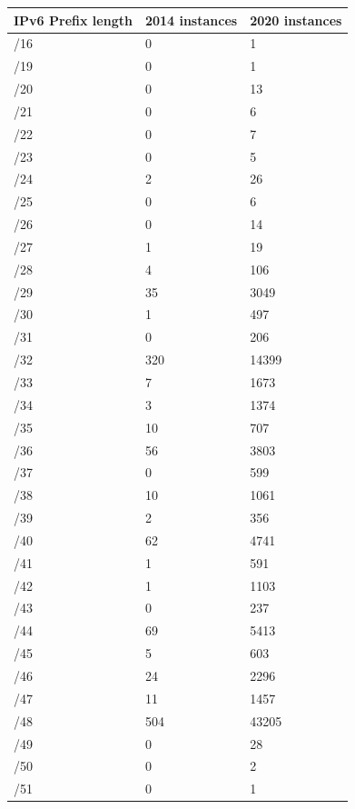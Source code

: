 \documentclass[10pt,sigconf]{acmart}
\begin{document}
\begin{table}[]
\centering
\label{ipv6-scanning}
\begin{center}
	\begin{tabular}{|l|l|l|}
		\hline
		IPv6 Prefix length & 2014 instances & 2020 instances   \\ \hline
		/16 & 0 & 1   \\ \hline
		/19 & 0 & 1   \\ \hline
		/20 & 0 & 13   \\ \hline
		/21 & 0 & 6  \\ \hline
		/22 & 0 & 7   \\ \hline
		/23 & 0 & 5   \\ \hline
		/24 & 2 & 26   \\ \hline
		/25 & 0 & 6   \\ \hline
		/26 & 0 & 14   \\ \hlinie
		/27 & 1 & 19   \\ \hline
		/28 & 4 & 106   \\ \hline
		/29 & 35 & 3049   \\ \hline
		/30 & 1 & 497   \\ \hline
		/31 & 0 & 206   \\ \hline
		/32 & 320 & 14399   \\ \hline
		/33 & 7 & 1673   \\ \hline
		/34 & 3 & 1374   \\ \hline
		/35 & 10 & 707   \\ \hline
		/36 & 56 & 3803   \\ \hline
		/37 & 0 & 599   \\ \hline
		/38 & 10 & 1061   \\ \hline
		/39 & 2 & 356   \\ \hline
		/40 & 62 & 4741   \\ \hline
		/41 & 1 & 591   \\ \hline
		/42 & 1 & 1103   \\ \hline
		/43 & 0 & 237   \\ \hline
		/44 & 69 & 5413   \\ \hline
		/45 & 5 & 603   \\ \hline
		/46 & 24 & 2296  \\ \hline
		/47 & 11 & 1457   \\ \hline
		/48 & 504 & 43205   \\ \hline
		/49 & 0 & 28   \\ \hline
		/50 & 0 & 2   \\ \hline
		/51 & 0 & 1   \\ \hline

\end{tabular}
\end{center}
\end{table}
\end{document}
